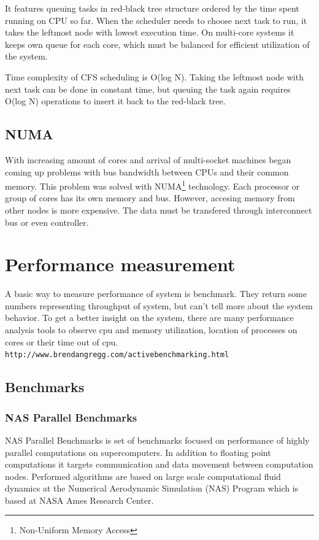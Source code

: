 It features queuing tasks in red-black tree structure ordered by the time spent
running on CPU so far. When the scheduler needs to choose next task to run, it
takes the leftmost node with lowest execution time. On multi-core systems it
keeps own queue for each core, which must be balanced for efficient utilization
of the system.

Time complexity of CFS scheduling is O(log N). Taking the leftmost node with
next task can be done in constant time, but queuing the task again requires
O(log N) operations to insert it back to the red-black tree.

\section{NUMA}
With increasing amount of cores and arrival of multi-socket machines began
coming up problems with bus bandwidth between CPUs and their common memory. This
problem was solved with NUMA\footnote{Non-Uniform Memory Access} technology.
Each processor or group of cores has its own memory and bus. However, accesing
memory from other nodes is more expensive. The data must be transfered through
interconnect bus or even controller.


\chapter{Performance measurement}
A basic way to measure performance of system is benchmark. They return some numbers representing throughput of system, but can't tell more about the system behavior.
To get a better insight on the system, there are many performance analysis tools to observe cpu and memory utilization, location of processes on cores or their time out of cpu.
\texttt{http://www.brendangregg.com/activebenchmarking.html}

\section{Benchmarks}

\subsection{NAS Parallel Benchmarks}
NAS Parallel Benchmarks is set of benchmarks focused on performance of highly
parallel computations on supercomputers. In addition to floating point
computations it targets communication and data movement between computation
nodes. Performed algorithms are based on large scale computational fluid
dynamics at the Numerical Aerodynamic Simulation (NAS) Program which is based at
NASA Ames Research Center.

